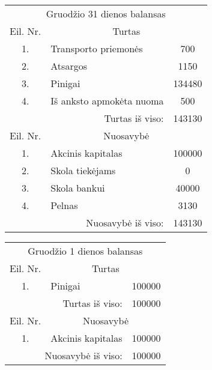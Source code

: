 \begin{tasks}
\begin{task}
\begin{solution}
      \begin{tabularx}{\tablewidth}[]{c X c}
        \multicolumn{3}{c}{Gruodžio 31 dienos balansas} \\
        Eil. Nr. & \multicolumn{2}{c}{Turtas} \\
        1. & Transporto priemonės & 700 \\
        2. & Atsargos & 1150 \\
        3. & Pinigai & 134480 \\
        4. & Iš anksto apmokėta nuoma & 500 \\
        \multicolumn{2}{r}{Turtas iš viso:} & 143130 \\
        Eil. Nr. & \multicolumn{2}{c}{Nuosavybė} \\
        1. & Akcinis kapitalas & 100000 \\
        2. & Skola tiekėjams & 0 \\
        3. & Skola bankui & 40000 \\
        4. & Pelnas & 3130 \\
        \multicolumn{2}{r}{Nuosavybė iš viso:} & 143130 \\
      \end{tabularx}

      \begin{tabularx}{\tablewidth}[]{c X c}
        \multicolumn{3}{c}{Gruodžio 1 dienos balansas} \\
        Eil. Nr. & \multicolumn{2}{c}{Turtas} \\
        1. & Pinigai & 100000 \\
        \multicolumn{2}{r}{Turtas iš viso:} & 100000 \\
        Eil. Nr. & \multicolumn{2}{c}{Nuosavybė} \\
        1. & Akcinis kapitalas & 100000 \\
        \multicolumn{2}{r}{Nuosavybė iš viso:} & 100000 \\
      \end{tabularx}
      
    \end{solution}
  \end{task}
\end{tasks}
